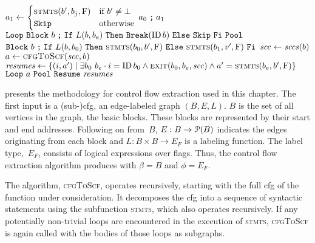 \begin{algorithm}
\begin{algorithmic}
      \State $a_1\gets\begin{cases}
        \Call{stmts}{b',b_j,\false} & \text{if }b'\neq\bot \\
        \ASkip & \text{otherwise}
      \end{cases}$
      \State\Return $a_0\mathrel{\texttt{;}} a_1$
    \EndFunction
      \State\Return $\texttt{Loop}~\texttt{Block}~b\mathrel{\texttt{;}}
      \texttt{If}~L(b,b_e)~\texttt{Then}~\texttt{Break}(\operatorname{ID} b)~\texttt{Else}~\texttt{Skip}~\texttt{Fi}~\texttt{Pool}$
    \EndFunction
        \State\Return $\ABB~b\ASeq\AIf~L(b,b_0)~\AThen~
        \Call{stmts}{b_0,b',\false}~\AElse~\Call{stmts}{b_1,v',\false}~\AFi$
    \EndFunction
    \label{line:loop}
      \State $\mathit{scc}\gets\mathit{sccs}(b)$
      \State $a\gets\Call{cfgToScf}{\var{scc},b}$
      \State $\var{resumes}\gets\{(i,a')\mid
      \exists b_0~b_e\cdot i=\ID b_0\wedge
      \Call{exit}{b_0,b_e,\var{scc}}\wedge a'=\Call{stmts}{b_e,b',\false}\}$
      \State\Return $\texttt{Loop}~a~\texttt{Pool}~\texttt{Resume}~\mathit{resumes}$
    \EndFunction
  \end{algorithmic}
\end{algorithm}

 presents the methodology for control flow extraction
used in this chapter.
The first input is a (sub-)\ac{cfg}, an edge-labeled graph $(B,E,L)$.
$B$ is the set of all vertices in the graph, the basic blocks.%
%
These blocks are represented by their start and end addresses.
Following on from~$B$, $E:B\rightarrow\operatorname{\mathcal{P}}(B)$%
indicates the edges originating from each block
and $L:B\times B\rightarrow E_F$ is a labeling function.
The label type,~$E_F$, consists of logical expressions over flags.%
Thus, the control flow extraction algorithm
produces  with $\beta=B$ and $\phi=E_F$.

The algorithm, \textsc{cfgToScf}, operates recursively,
starting with the full \ac{cfg} of the function under consideration.
It decomposes the \ac{cfg} into a sequence of syntactic statements
using the subfunction \textsc{stmts}, which also operates recursively.
If any potentially non-trivial loops are encountered
in the execution of \textsc{stmts},
\textsc{cfgToScf} is again called with the bodies of those loops as subgraphs.

